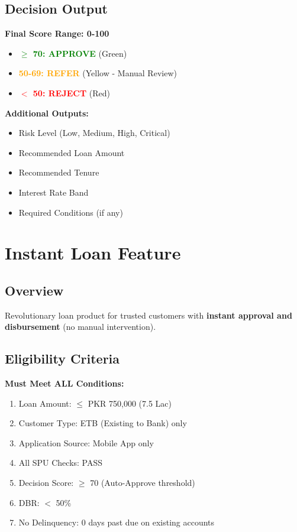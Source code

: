 \documentclass[12pt,a4paper]{article}
\begin{document}
\subsection{Decision Output}

\textbf{Final Score Range: 0-100}
\begin{itemize}
    \item \textcolor{green}{\textbf{$\geq$ 70: APPROVE}} (Green)
    \item \textcolor{orange}{\textbf{50-69: REFER}} (Yellow - Manual Review)
    \item \textcolor{red}{\textbf{$<$ 50: REJECT}} (Red)
\end{itemize}

\textbf{Additional Outputs:}
\begin{itemize}[noitemsep]
    \item Risk Level (Low, Medium, High, Critical)
    \item Recommended Loan Amount
    \item Recommended Tenure
    \item Interest Rate Band
    \item Required Conditions (if any)
\end{itemize}

\newpage

\section{Instant Loan Feature}

\subsection{Overview}
Revolutionary loan product for trusted customers with \textbf{instant approval and disbursement} (no manual intervention).

\subsection{Eligibility Criteria}

\textbf{Must Meet ALL Conditions:}
\begin{enumerate}
    \item Loan Amount: $\leq$ PKR 750,000 (7.5 Lac)
    \item Customer Type: ETB (Existing to Bank) only
    \item Application Source: Mobile App only
    \item All SPU Checks: PASS
    \item Decision Score: $\geq$ 70 (Auto-Approve threshold)
    \item DBR: $<$ 50\%
    \item No Delinquency: 0 days past due on existing accounts
\end{enumerate}
\end{document}
